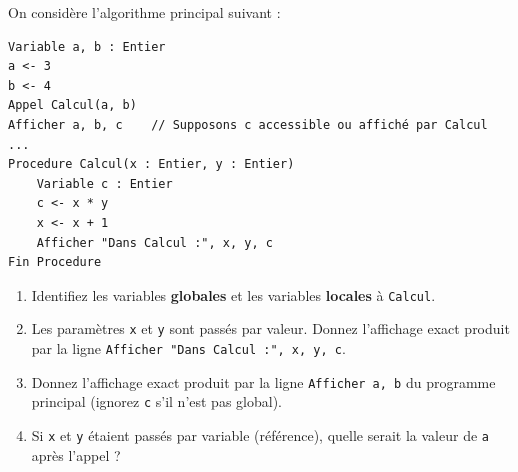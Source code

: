 \documentclass[11pt]{article}
\begin{document}
\begin{exercice}
On considère l'algorithme principal suivant :
\begin{verbatim}
Variable a, b : Entier
a <- 3
b <- 4
Appel Calcul(a, b)
Afficher a, b, c    // Supposons c accessible ou affiché par Calcul
...
Procedure Calcul(x : Entier, y : Entier)
    Variable c : Entier
    c <- x * y
    x <- x + 1
    Afficher "Dans Calcul :", x, y, c
Fin Procedure
\end{verbatim}
\begin{enumerate}
    \item Identifiez les variables \textbf{globales} et les variables \textbf{locales} à \texttt{Calcul}.
    \item Les paramètres \texttt{x} et \texttt{y} sont passés par valeur. Donnez l'affichage exact produit par la ligne \texttt{Afficher "Dans Calcul :", x, y, c}.
    \item Donnez l'affichage exact produit par la ligne \texttt{Afficher a, b} du programme principal (ignorez \texttt{c} s'il n'est pas global).
    \item Si \texttt{x} et \texttt{y} étaient passés par variable (référence), quelle serait la valeur de \texttt{a} après l'appel ?
\end{enumerate}
\end{exercice}
\end{document}
